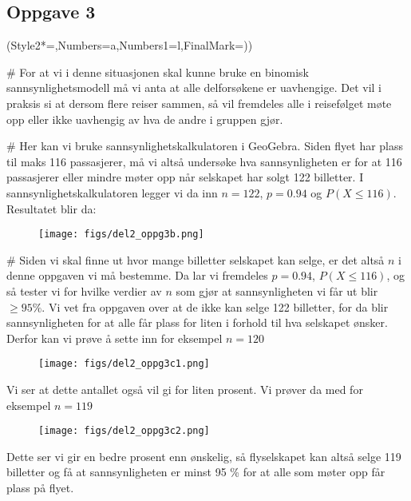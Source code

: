 \subsection*{Oppgave 3}
\begin{easylist}[enumerate]
	\ListProperties(Style2*=,Numbers=a,Numbers1=l,FinalMark={)})
	
	# For at vi i denne situasjonen skal kunne bruke en binomisk sannsynlighetsmodell må vi anta at alle delforsøkene er uavhengige. Det vil i praksis si at dersom flere reiser sammen, så vil fremdeles alle i reisefølget møte opp eller ikke uavhengig av hva de andre i gruppen gjør.
	
	# Her kan vi bruke sannsynlighetskalkulatoren i GeoGebra. Siden flyet har plass til maks 116 passasjerer, må vi altså undersøke hva sannsynligheten er for at 116 passasjerer eller mindre møter opp når selskapet har solgt 122 billetter. I sannsynlighetskalkulatoren legger vi da inn $n = 122$, $p = 0.94$ og $P(X \leq 116)$. Resultatet blir da:
	
	\begin{figure}[ht!]
		\centering
		\texttt{[image: figs/del2\_oppg3b.png]}
		\label{fig:del2_oppg3b}
	\end{figure}
	

	# Siden vi skal finne ut hvor mange billetter selskapet kan selge, er det altså $n$ i denne oppgaven vi må bestemme. Da lar vi fremdeles $p = 0.94$, $P(X \leq 116)$, og så tester vi for hvilke verdier av $n$ som gjør at sannsynligheten vi får ut blir $\geq 95\% $. Vi vet fra oppgaven over at de ikke kan selge 122 billetter, for da blir sannsynligheten for at alle får plass for liten i forhold til hva selskapet ønsker. Derfor kan vi prøve å sette inn for eksempel $n = 120$
	
	
	
	\begin{figure}[h]
		\centering
		\texttt{[image: figs/del2\_oppg3c1.png]}
	\end{figure}
	
	\newpage
	Vi ser at dette antallet også vil gi for liten prosent. Vi prøver da med for eksempel $n = 119$
	
	\begin{figure}[ht!]
		\centering
		\texttt{[image: figs/del2\_oppg3c2.png]}
	\end{figure}
	
	Dette ser vi gir en bedre prosent enn ønskelig, så flyselskapet kan altså selge 119 billetter og få at sannsynligheten er minst 95 \% for at alle som møter opp får plass på flyet.	
	
	
\end{easylist}

